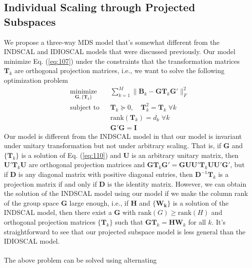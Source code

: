 \subsection{Individual Scaling through Projected Subspaces}
\label{sec:indiv-scal-thro}
We propose a three-way MDS model that's somewhat different from the
INDSCAL and IDIOSCAL models that were discussed previously. Our model
minimize Eq. (\ref{eq:107}) under the constraints that the
transformation matrices $\mathbf{T}_k$ are orthogonal projection
matrices, i.e., we want to solve the following optimization problem
\begin{equation}
  \label{eq:110}
	\begin{aligned}
	& \underset{\mathbf{G}, \{\mathbf{T}_k\}}{\text{minimize}}
	& & \sum_{k=1}^{M} \| \mathbf{B}_k - \mathbf{G}
\mathbf{T}_k \mathbf{G}' \|_F^2 \\
	& \text{subject to}
	& & \mathbf{T}_k \succeq 0, \quad \mathbf{T}_k^2 = \mathbf{T}_k \;
    \forall k\\
    & & & \mathrm{rank}(\mathbf{T}_k) = d_k \; \forall k \\
	&&& \mathbf{G}' \mathbf{G} = \mathbf{I}
	\end{aligned}
\end{equation}
Our model is different from the INDSCAL model in that our model is
invariant under unitary transformation but not under arbitrary
scaling. That is, if $\mathbf{G}$ and $\{\mathbf{T}_k\}$ is a solution
of Eq. (\ref{eq:110}) and $\mathbf{U}$ is an
arbitrary unitary matrix, then $\mathbf{U}' \mathbf{T}_k \mathbf{U}$
are orthogonal projection matrices and $\mathbf{G} \mathbf{T}_k
\mathbf{G}' = \mathbf{G} \mathbf{U} \mathbf{U}' \mathbf{T}_k
\mathbf{U} \mathbf{U}' \mathbf{G}'$, but if $\mathbf{D}$ is any diagonal matrix
with positive diagonal entries, then $\mathbf{D}^{-1} \mathbf{T}_k$ is
a projection matrix if and only if $\mathbf{D}$ is the identity
matrix. However, we can obtain the solution of the INDSCAL model using
our model if we make the column rank of the group space $\mathbf{G}$ large enough,
i.e., if $\mathbf{H}$ and $\{\mathbf{W_k}\}$ is a solution of the
INDSCAL model, then there exist a $\mathbf{G}$ with $\mathrm{rank}(G)
\geq \mathrm{rank}(H)$ and orthogonal projection matrices $\{\mathbf{T}_k\}$
such that $\mathbf{G}\mathbf{T}_k = \mathbf{H}\mathbf{W}_k$ for all
$k$. It's straightforward to see that our projected subspace
model is less general than the IDIOSCAL model. \\ \\
%
%
\noindent The above problem can be solved using alternating
